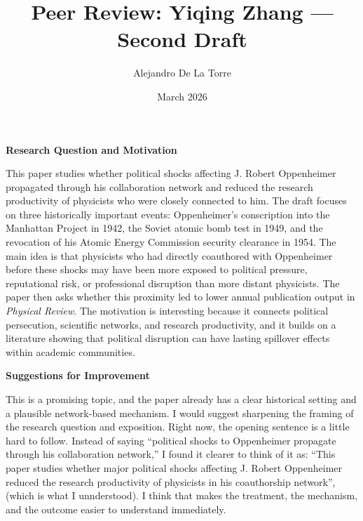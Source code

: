\documentclass[12pt]{article}
\title{Peer Review: Yiqing Zhang --- Second Draft}
\author{Alejandro De La Torre}
\date{March 2026}
\begin{document}
\maketitle

\singlespacing

\textbf{Research Question and Motivation}

This paper studies whether political shocks affecting J. Robert Oppenheimer propagated through his collaboration network and reduced the research productivity of physicists who were closely connected to him. The draft focuses on three historically important events: Oppenheimer's conscription into the Manhattan Project in 1942, the Soviet atomic bomb test in 1949, and the revocation of his Atomic Energy Commission security clearance in 1954. The main idea is that physicists who had directly coauthored with Oppenheimer before these shocks may have been more exposed to political pressure, reputational risk, or professional disruption than more distant physicists. The paper then asks whether this proximity led to lower annual publication output in \textit{Physical Review}. The motivation is interesting because it connects political persecution, scientific networks, and research productivity, and it builds on a literature showing that political disruption can have lasting spillover effects within academic communities.

\textbf{Suggestions for Improvement}

This is a promising topic, and the paper already has a clear historical setting and a plausible network-based mechanism. I would suggest sharpening the framing of the research question and exposition. Right now, the opening sentence is a little hard to follow. Instead of saying ``political shocks to Oppenheimer propagate through his collaboration network,'' I found it clearer to think of it as: ``This paper studies whether major political shocks affecting J. Robert Oppenheimer reduced the research productivity of physicists in his coauthorship network'', (which is what I unnderstood). I think that makes the treatment, the mechanism, and the outcome easier to understand immediately.
\end{document}
